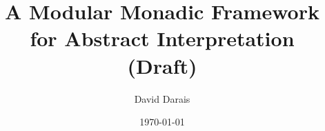 \documentclass{article}
\title{A Modular Monadic Framework for Abstract Interpretation \\ (Draft)}
\author{David Darais}
\date{\today}
\begin{document}
\maketitle

\begin{abstract}

\end{abstract}


\end{document}
